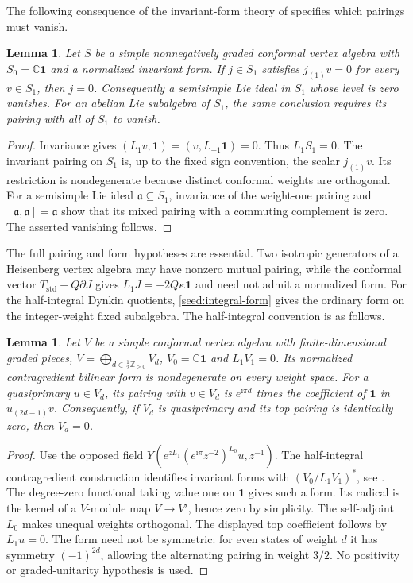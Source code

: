 \documentclass[11pt,a4paper]{amsart}
\numberwithin{equation}{section}
\newtheorem{lemma}[theorem]{Lemma}
\theoremstyle{definition}
\theoremstyle{remark}
\newcommand{\C}{\mathbb C}
\newcommand{\Z}{\mathbb Z}
\begin{document}
The following consequence of the invariant-form theory of
\cite{LiForms1994} specifies which pairings must vanish.

\begin{lemma}\label{com:zero-current}
Let $S$ be a simple nonnegatively graded conformal vertex algebra
with $S_0=\C\mathbf1$ and a normalized invariant form. If
$j\in S_1$ satisfies $j_{(1)}v=0$ for every $v\in S_1$, then
$j=0$. Consequently a semisimple Lie ideal in $S_1$ whose
level is zero vanishes. For an abelian Lie subalgebra of $S_1$, the same conclusion requires
its pairing with all of $S_1$ to vanish.
\end{lemma}
\begin{proof}
Invariance gives $(L_1v,\mathbf1)=(v,L_{-1}\mathbf1)=0$.
Thus $L_1S_1=0$. The invariant pairing on $S_1$ is, up to the
fixed sign convention, the scalar $j_{(1)}v$. Its restriction is
nondegenerate because distinct conformal weights are orthogonal.
For a semisimple Lie ideal $\mathfrak a\subseteq S_1$, invariance
of the weight-one pairing and $[\mathfrak a,\mathfrak a]
=\mathfrak a$ show that its mixed pairing with a commuting
complement is zero. The asserted vanishing follows.
\end{proof}

The full pairing and form hypotheses are essential. Two isotropic generators of a Heisenberg vertex algebra
may have nonzero mutual pairing, while the conformal
vector $T_{\mathrm{std}}+Q\partial J$ gives
$L_1J=-2Q\kappa\mathbf1$ and need not admit a normalized form.
For the half-integral Dynkin quotients, \cref{seed:integral-form}
gives the ordinary form on the integer-weight fixed subalgebra.
The half-integral convention is as follows.

\begin{lemma}\label{v5:half-pairing}
Let $V$ be a simple conformal vertex algebra with finite-dimensional graded pieces,
$V=\bigoplus_{d\in\frac12\Z_{\ge0}}V_d$, $V_0=\C\mathbf1$ and
$L_1V_1=0$. Its normalized contragredient bilinear form is nondegenerate
on every weight space. For a quasiprimary $u\in V_d$, its pairing
with $v\in V_d$ is $e^{\mathrm i\pi d}$ times the coefficient
of $\mathbf1$ in $u_{(2d-1)}v$. Consequently, if $V_d$ is quasiprimary and its
top pairing is identically zero, then $V_d=0$.
\end{lemma}
\begin{proof}
Use the opposed field
$Y(e^{zL_1}(e^{\mathrm i\pi}z^{-2})^{L_0}u,z^{-1})$.
The half-integral contragredient construction identifies invariant
forms with $(V_0/L_1V_1)^*$, see \cite[\S2.1, Remarks 2.5, 2.8
and the proof of Proposition 2.9]{BeemGarner2026}. The degree-zero functional taking value one on $\mathbf1$ gives such
a form. Its radical is the kernel of
a $V$-module map $V\to V'$, hence zero by simplicity. The self-adjoint
$L_0$ makes unequal weights orthogonal. The displayed top coefficient
follows by $L_1u=0$. The form need not be symmetric: for even states
of weight $d$ it has symmetry $(-1)^{2d}$, allowing the alternating
pairing in weight $3/2$. No positivity or graded-unitarity hypothesis
is used.
\end{proof}
\end{document}
